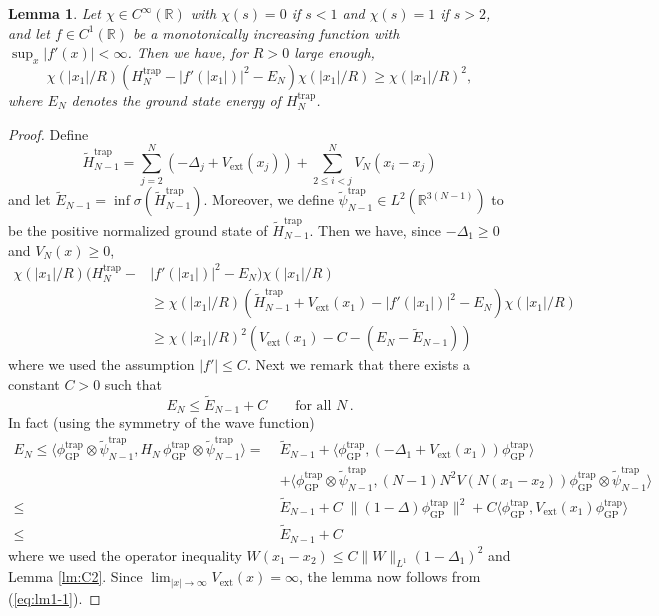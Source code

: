\documentclass[11pt]{article}
\newtheorem{lemma}[theorem]{Lemma}
\newcommand{\Htrap}{H_N^{\text{trap}}}
\newcommand{\Vtrap}{V_{\text{ext}}}
\newcommand{\phitrap}{\phi_{\text{GP}}^{\text{trap}}}
\newcommand{\bR}{{\mathbb R}}
\newcommand{\wt}{\widetilde}
\begin{document}
\begin{lemma}\label{lm:C4}
Let $\chi \in C^{\infty} (\bR)$ with $\chi (s) = 0$ if $s <1$ and
$\chi (s) =1$ if $s >2$, and let $f \in C^1 (\bR)$ be a
monotonically increasing function with $\sup_x |f' (x)| <
\infty$. Then we have, for $R >0$ large enough,
\[ \chi (|x_1|/R) \left( \Htrap - |f' (|x_1|)|^2 - E_N \right) \chi
(|x_1|/R) \geq \chi (|x_1|/R)^2, \]
where $E_N$ denotes the ground state energy of $\Htrap$.
\end{lemma}
\begin{proof}
Define \[ \wt H^{\text{trap}}_{N-1} = \sum_{j=2}^N \left(-\Delta_j +
\Vtrap (x_j) \right) + \sum_{2 \leq i < j}^N V_N (x_i -x_j) \] and
let $\wt E_{N-1} = \inf \sigma (\wt H^{\text{trap}}_{N-1})$.
Moreover, we define $\wt \psi^{\text{trap}}_{N-1} \in L^2
(\bR^{3(N-1)})$ to be the positive normalized ground state of $\wt
H^{\text{trap}}_{N-1}$. Then we have, since $-\Delta_1 \geq 0$ and
$V_N(x) \geq 0$,
\begin{equation}\label{eq:lm1-1}
\begin{split}
\chi (|x_1|/R) \Big( \Htrap - &|f' (|x_1|)|^2 - E_N \Big) \chi
(|x_1|/R) \\ &\geq \chi (|x_1|/R) \left( \wt H^{\text{trap}}_{N-1} +
\Vtrap (x_1) - |f' (|x_1|)|^2 - E_N \right) \chi (|x_1|/R) \\ & \geq
\chi (|x_1|/R)^2 \left( \Vtrap (x_1) - C - (E_N - \wt E_{N-1})
\right)
\end{split}
\end{equation}
where we used the assumption $|f'|\leq C$. Next we remark that there
exists a constant $C>0$ such that \[ E_N \leq \wt E_{N-1} + C \qquad
\text{for all } N \,. \] In fact (using the symmetry of the wave
function)
\begin{equation}
\begin{split}
E_N \leq \langle \phitrap \otimes \wt \psi_{N-1}^{\text{trap}},
H_N\, \phitrap \otimes \wt \psi_{N-1}^{\text{trap}} \rangle = \;
&\wt E_{N-1} + \langle \phitrap, \left( -\Delta_1 + \Vtrap (x_1)
\right) \phitrap \rangle \\ &+ \langle \phitrap \otimes \wt
\psi_{N-1}^{\text{trap}}, (N-1) N^2 V (N (x_1 - x_2)) \phitrap
\otimes \wt \psi_{N-1}^{\text{trap}} \rangle \\ \leq \; &\wt E_{N-1}
+ C \; \| (1-\Delta)
\phitrap \|^2 + C \langle \phitrap, \Vtrap (x_1) \phitrap\rangle \\
\leq \; &\wt E_{N-1} + C
\end{split}
\end{equation}
where we used the operator inequality $W (x_1 -x_2) \leq C \| W
\|_{L^1} (1-\Delta_1)^2$ and Lemma \ref{lm:C2}. Since $\lim_{|x| \to
\infty} \Vtrap (x) = \infty$, the lemma now follows from
(\ref{eq:lm1-1}).
\end{proof}
\end{document}
